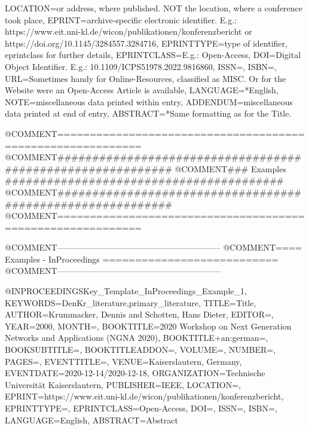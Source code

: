 {    LOCATION={or address, where published. NOT the location, where a conference took place},
    EPRINT={archive-specific electronic identifier. E.g.: https://www.eit.uni-kl.de/wicon/publikationen/konferenzbericht   or   https://doi.org/10.1145/3284557.3284716},
    EPRINTTYPE={type of identifier, eprintclass for further details},
    EPRINTCLASS={E.g.: Open-Access},
    DOI={Digital Object Identifier. E.g.: 10.1109/ICPS51978.2022.9816860},
    ISSN={},
    ISBN={},
    URL={Sometimes handy for Online-Resources, classified as MISC. Or for the Website were an Open-Access Article is available},
    LANGUAGE={*English},
    NOTE={miscellaneous data printed within entry},
    ADDENDUM={miscellaneous data printed at end of entry},
    ABSTRACT={\begingroup
        {*Same formatting as for the Title.}\endgroup}
}












@COMMENT{===========================================================}
@COMMENT{###########################################################}
@COMMENT{###    Examples    ########################################}
@COMMENT{###########################################################}
@COMMENT{===========================================================}


@COMMENT{-----------------------------------------------------------}
@COMMENT{====  Examples - InProceedings  ===========================}
@COMMENT{-----------------------------------------------------------}

@INPROCEEDINGS{Key_Template_InProceedings_Example_1,
    KEYWORDS={DenKr_literature,primary_literature},
    TITLE={\begingroup
        {Title}\endgroup},
    AUTHOR={Krummacker, Dennis and Schotten, Hans Dieter},
    EDITOR={},
    YEAR={2000},
    MONTH={},
    BOOKTITLE={2020 Workshop on Next Generation Networks and Applications (NGNA 2020)},
    BOOKTITLE+an:german={},
    BOOKSUBTITLE={},
    BOOKTITLEADDON={},
    VOLUME={},
    NUMBER={},
    PAGES={},
    EVENTTITLE={},
    VENUE={Kaiserslautern, Germany},
    EVENTDATE={2020-12-14/2020-12-18},
    ORGANIZATION={Technische Universit{\"a}t Kaiserslautern},
    PUBLISHER={IEEE},
    LOCATION={},
    EPRINT={https://www.eit.uni-kl.de/wicon/publikationen/konferenzbericht},
    EPRINTTYPE={},
    EPRINTCLASS={Open-Access},
    DOI={},
    ISSN={},
    ISBN={},
    LANGUAGE={English},
    ABSTRACT={\begingroup
        {Abstract}\endgroup}
}

